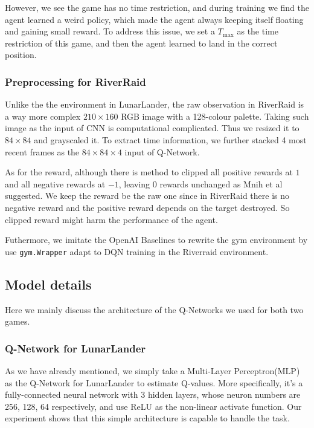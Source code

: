 \documentclass[12pt]{article}
\begin{document}
However, we see the game has no time restriction, and during training we find the agent learned a weird policy, which made the agent always keeping itself floating and gaining small reward. To address this issue, we set a $T_{\mathrm{max}}$ as the time restriction of this game, and then the agent learned to land in the correct position.

\subsubsection{Preprocessing for RiverRaid}
Unlike the the environment in LunarLander, the raw observation in RiverRaid is a way more complex $210 \times 160 $ RGB image with a 128-colour palette. Taking such image as the input of CNN is computational complicated. Thus we resized it to $84 \times 84$ and grayscaled it. To extract time information, we further stacked 4 most recent frames as the $84 \times 84 \times 4$ input of Q-Network.

As for the reward, although there is method to clipped all positive rewards at $1$ and all negative rewards at $-1$, leaving $0$ rewards unchanged as Mnih et al \cite{DBLP:journals/nature/MnihKSRVBGRFOPB15} suggested. We keep the reward be the raw one since in RiverRaid there is no negative reward and the positive reward depends on the target destroyed. So clipped reward might harm the performance of the agent.

Futhermore, we imitate the OpenAI Baselines to rewrite the gym environment by use \texttt{gym.Wrapper}  adapt to DQN training in the Riverraid environment. 


\subsection{Model details}
Here we mainly discuss the architecture of the Q-Networks we used for both two games.
\subsubsection{Q-Network for LunarLander}
As we have already mentioned, we simply take a Multi-Layer Perceptron(MLP) as the Q-Network for LunarLander to estimate Q-values. More specifically, it's a fully-connected neural network with 3 hidden layers, whose neuron numbers are 256, 128, 64 respectively, and use ReLU \cite{glorot2011deep} as the non-linear activate function. Our experiment shows that this simple architecture is capable to handle the task.
\end{document}
